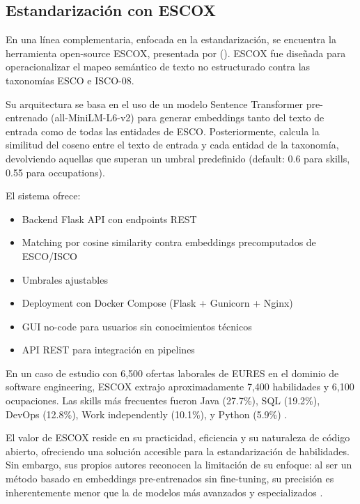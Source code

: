 \subsection{Estandarización con ESCOX}

En una línea complementaria, enfocada en la estandarización, se encuentra la herramienta open-source ESCOX, presentada por \citeauthor{kavargyris2025} (\citeyear{kavargyris2025}). ESCOX fue diseñada para operacionalizar el mapeo semántico de texto no estructurado contra las taxonomías ESCO e ISCO-08.

Su arquitectura se basa en el uso de un modelo Sentence Transformer pre-entrenado (all-MiniLM-L6-v2) para generar embeddings tanto del texto de entrada como de todas las entidades de ESCO. Posteriormente, calcula la similitud del coseno entre el texto de entrada y cada entidad de la taxonomía, devolviendo aquellas que superan un umbral predefinido (default: 0.6 para skills, 0.55 para occupations).

El sistema ofrece:

\begin{itemize}
    \item Backend Flask API con endpoints REST
    \item Matching por cosine similarity contra embeddings precomputados de ESCO/ISCO
    \item Umbrales ajustables
    \item Deployment con Docker Compose (Flask + Gunicorn + Nginx)
    \item GUI no-code para usuarios sin conocimientos técnicos
    \item API REST para integración en pipelines
\end{itemize}

En un caso de estudio con 6,500 ofertas laborales de EURES en el dominio de software engineering, ESCOX extrajo aproximadamente 7,400 habilidades y 6,100 ocupaciones. Las skills más frecuentes fueron Java (27.7\%), SQL (19.2\%), DevOps (12.8\%), Work independently (10.1\%), y Python (5.9\%) \cite{kavargyris2025}.

El valor de ESCOX reside en su practicidad, eficiencia y su naturaleza de código abierto, ofreciendo una solución accesible para la estandarización de habilidades. Sin embargo, sus propios autores reconocen la limitación de su enfoque: al ser un método basado en embeddings pre-entrenados sin fine-tuning, su precisión es inherentemente menor que la de modelos más avanzados y especializados \cite{kavargyris2025}.

